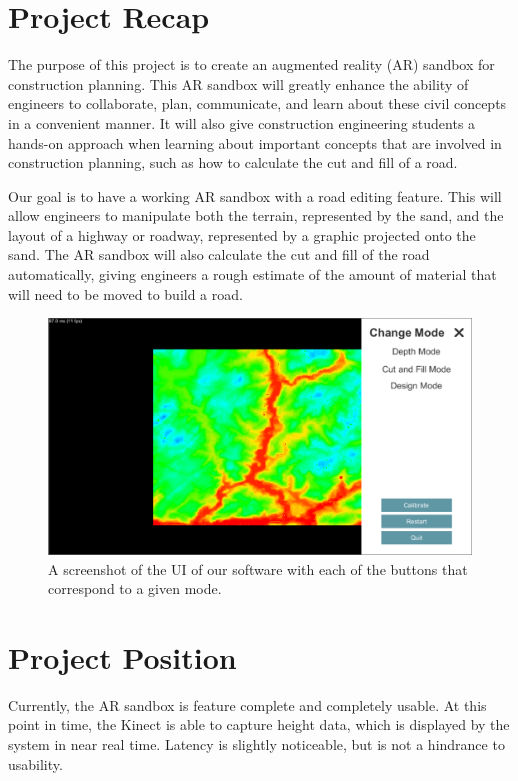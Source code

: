 \documentclass[onecolumn, draftclsnofoot,10pt, compsoc]{IEEEtran}
\begin{document}
\section{Project Recap} %
The purpose of this project is to create an augmented reality (AR) sandbox for construction planning.
This AR sandbox will greatly enhance the ability of engineers to collaborate, plan, communicate, and learn about these civil concepts in a convenient manner.
It will also give construction engineering students a hands-on approach when learning about important concepts that are involved in construction planning, such as how to calculate the cut and fill of a road.

\par Our goal is to have a working AR sandbox with a road editing feature.
This will allow engineers to manipulate both the terrain, represented by the sand, and the layout of a highway or roadway, represented by a graphic projected onto the sand.
The AR sandbox will also calculate the cut and fill of the road automatically, giving engineers a rough estimate of the amount of material that will need to be moved to build a road.

\begin{figure}[H]
	\centering
	\includegraphics[width=1.\textwidth]{UI}
	\caption{A screenshot of the UI of our software with each of the buttons that correspond to a given mode.}
	\label{fig:UI}
\end{figure}

\section{Project Position} 

Currently, the AR sandbox is feature complete and completely usable. At this point in time, the Kinect is able to capture height data, which is displayed by the system in near real time. Latency is slightly noticeable, but is not a hindrance to usability. 
\end{document}
